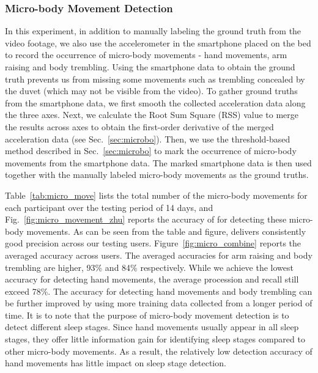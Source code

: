 \subsubsection{Micro-body Movement Detection}

In this experiment, in addition to manually labeling the ground truth from the video footage, we also use the accelerometer in the
smartphone placed on the bed to record the occurrence of micro-body movements - hand movements, arm raising and body trembling. Using the
smartphone data to obtain the ground truth prevents us from missing some movements such as trembling concealed by the duvet (which may not
be visible from the video). To gather ground truths from the smartphone data, we first smooth the collected acceleration data along the
three axes. Next, we calculate the Root Sum Square (RSS) value to merge the results across axes to obtain the first-order derivative of the
merged acceleration data (see Sec.~\ref{sec:microbo}). Then, we use the threshold-based method described in Sec.~\ref{sec:microbo} to mark
the occurrence of micro-body movements from the smartphone data. The marked smartphone data is then used together with the manually labeled
micro-body movements as the ground truths.

Table~\ref{tab:micro_move} lists the total number of the micro-body movements for each participant over the testing period of 14 days, and
Fig.~\ref{fig:micro_movement_zhu} reports the accuracy of {\systemname} for detecting these micro-body movements. As can be seen from the
table and figure, \systemname delivers consistently good precision across our testing users. Figure~\ref{fig:micro_combine} reports the
averaged accuracy across users. The averaged accuracies for arm raising and body trembling are higher, 93\% and 84\% respectively. While we
achieve the lowest accuracy for detecting hand movements, the average procession and recall still exceed 78\%. The accuracy for detecting
hand movements and body trembling can be further improved by using more training data collected from a longer period of time. It is to note
that the purpose of micro-body movement detection is to detect different sleep stages. Since hand movements usually appear in all sleep
stages, they offer little information gain for identifying sleep stages compared to other micro-body movements.  As a result, the
relatively low detection accuracy of hand movements has little impact on sleep stage detection.


